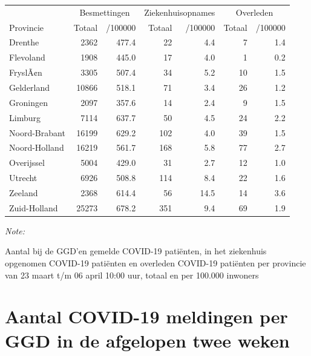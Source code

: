\documentclass[
  english,
  man,floatsintext]{apa6}
\begin{document}
\begin{table}
\centering
\begin{threeparttable}
\begin{tabular}{lrrrrrr}
\toprule
\multicolumn{1}{c}{ } & \multicolumn{2}{c}{Besmettingen} & \multicolumn{2}{c}{Ziekenhuisopnames} & \multicolumn{2}{c}{Overleden} \\
\cmidrule(l{3pt}r{3pt}){2-3} \cmidrule(l{3pt}r{3pt}){4-5} \cmidrule(l{3pt}r{3pt}){6-7}
Provincie & Totaal & /100000 & Totaal & /100000 & Totaal & /100000\\
\midrule
Drenthe & 2362 & 477.4 & 22 & 4.4 & 7 & 1.4\\
Flevoland & 1908 & 445.0 & 17 & 4.0 & 1 & 0.2\\
FryslÃ¢n & 3305 & 507.4 & 34 & 5.2 & 10 & 1.5\\
Gelderland & 10866 & 518.1 & 71 & 3.4 & 26 & 1.2\\
Groningen & 2097 & 357.6 & 14 & 2.4 & 9 & 1.5\\
Limburg & 7114 & 637.7 & 50 & 4.5 & 24 & 2.2\\
Noord-Brabant & 16199 & 629.2 & 102 & 4.0 & 39 & 1.5\\
Noord-Holland & 16219 & 561.7 & 168 & 5.8 & 77 & 2.7\\
Overijssel & 5004 & 429.0 & 31 & 2.7 & 12 & 1.0\\
Utrecht & 6926 & 508.8 & 114 & 8.4 & 22 & 1.6\\
Zeeland & 2368 & 614.4 & 56 & 14.5 & 14 & 3.6\\
Zuid-Holland & 25273 & 678.2 & 351 & 9.4 & 69 & 1.9\\
\bottomrule
\end{tabular}
\begin{tablenotes}
\item \textit{Note: } 
\item Aantal bij de GGD’en gemelde COVID-19 patiënten, in het ziekenhuis opgenomen COVID-19 patiënten en overleden COVID-19 patiënten per provincie van 23 maart t/m 06 april 10:00 uur, totaal en per 100.000 inwoners
\end{tablenotes}
\end{threeparttable}
\end{table}

\newpage

\hypertarget{aantal-covid-19-meldingen-per-ggd-in-de-afgelopen-twee-weken}{%
\section{Aantal COVID-19 meldingen per GGD in de afgelopen twee weken}\label{aantal-covid-19-meldingen-per-ggd-in-de-afgelopen-twee-weken}}
\end{document}
